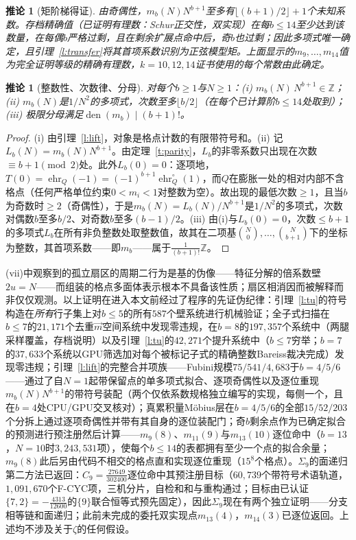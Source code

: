 \documentclass[11pt]{article}
\numberwithin{equation}{section}
\newtheorem{corollary}[theorem]{推论}
\theoremstyle{definition}
\theoremstyle{remark}
\begin{document}
\begin{corollary}[矩阶梯得证]\label{c:pin}
由奇偶性，$m_b(N)N^{b+1}$至多有$\lfloor(b{+}1)/2\rfloor+1$个未知系数。存档精确值（已证明有理数：Schur正交性，双实现）在每$b\le14$至少达到该数量，在每偶$b$严格过剩，且在剩余扩展点命中后，奇$b$也过剩；因此多项式唯一确定，且引理~\ref{l:transfer}将其首项系数识别为正弦模型矩。上面显示的$m_9,\dots,m_{14}$值为完全证明等级的精确有理数，$k=10,12,14$证书使用的每个常数由此确定。
\end{corollary}

\begin{corollary}[整数性、次数律、分母]\label{c:struct}
对每个$b\ge1$与$N\ge1$：(i) $m_b(N)\,N^{b+1}\in\mathbb Z$；
(ii) $m_b(N)$是$1/N^{2}$的多项式，次数至多$\lfloor b/2\rfloor$（在每个已计算阶$b\le14$处取到）；
(iii) 极限分母满足$\operatorname{den}(m_b)\mid(b{+}1)!$。
\end{corollary}

\begin{proof}
(i) 由引理~\ref{l:lift}，对象是格点计数的有限带符号和。(ii) 记$L_b(N)=m_b(N)N^{b+1}$。由定理~\ref{t:parity}，$L_b$的非零系数只出现在次数$\equiv b+1\pmod2$处。此外$L_b(0)=0$：逐项地，$T(0)=\operatorname{ehr}_Q(-1)=(-1)^{b+1}\operatorname{ehr}_Q^{\circ}(1)$，而$Q$在膨胀一处的相对内部不含格点（任何严格单位约束$0<m_i<1$对整数为空）。故出现的最低次数$\ge1$，且当$b$为奇数时$\ge2$（奇偶性），于是$m_b(N)=L_b(N)/N^{b+1}$是$1/N^{2}$的多项式，次数对偶数$b$至多$b/2$、对奇数$b$至多$(b-1)/2$。(iii) 由(i)与$L_b(0)=0$，次数$\le b+1$的多项式$L_b$在所有非负整数处取整数值，故其在二项基$\binom N0,\dots,\binom N{b+1}$下的坐标为整数，其首项系数——即$m_b$——属于$\tfrac1{(b+1)!}\mathbb Z$。
\end{proof}

(vii)中观察到的孤立扇区的周期二行为是基的伪像——特征分解的倍系数壁$2u=N$——而组装的格点多面体表示根本不具备该性质；扇区相消因而被解释而非仅仅观测。以上证明在进入本文前经过了程序的先证伪纪律：引理~\ref{l:tu}的符号构造在\emph{所有}行子集上对$b\le5$的所有$587$个壁系统进行机械验证；全子式扫描在$b\le7$的$21{,}171$个去重$\vec m$空间系统中发现零违规，在$b=8$的$197{,}357$个系统中（两腿采样覆盖，存档说明）以及引理~\ref{l:tu}的$42{,}271$个提升系统中（$b\le7$穷举；$b=7$的$37{,}633$个系统以GPU筛选加对每个被标记子式的精确整数Bareiss裁决完成）发现零违规；引理~\ref{l:lift}的完整合并项族——Fubini规模$75/541/4{,}683$于$b=4/5/6$——通过了自$N{=}1$起带保留点的单多项式拟合、逐项奇偶性以及逐位重现$m_b(N)N^{b+1}$的带符号装配（两个仅依系数规格独立编写的实现，每侧一个，且在$b=4$处CPU/GPU交叉核对）；真累积量M\"obius层在$b=4/5/6$的全部$15/52/203$个分拆上通过逐项奇偶性并带有其自身的逐位装配门；奇$b$剩余点作为已确定拟合的预测进行预注册然后计算——$m_9(8)$、$m_{11}(9)$与$m_{13}(10)$逐位命中（$b{=}13$，$N{=}10$时$3{,}243{,}531$项），使每个$b\le14$的表都拥有至少一个点的拟合余量；$m_9(8)$此后另由代码不相交的格点直和实现逐位重现（$15^8$个格点）。$\Sigma_9$的面递归第二方法已返回：$C_9=\tfrac{27649}{302400}$逐位命中其预注册目标（$60{,}739$个带符号术语轨道，$1{,}091{,}670$个F-CYC项，三机分片，自检和和与重构通过；目标由已认证$\{7,2\}=-\tfrac{4313}{12600}$的$\{9\}$联合恒等式预先固定），因此$\Sigma_9$现在有两个独立证明——分支相等链和面递归；此前未完成的委托双实现点$m_{13}(4)$，$m_{14}(3)$已逐位返回。上述均不涉及关于$\zeta$的任何假设。
\end{document}
